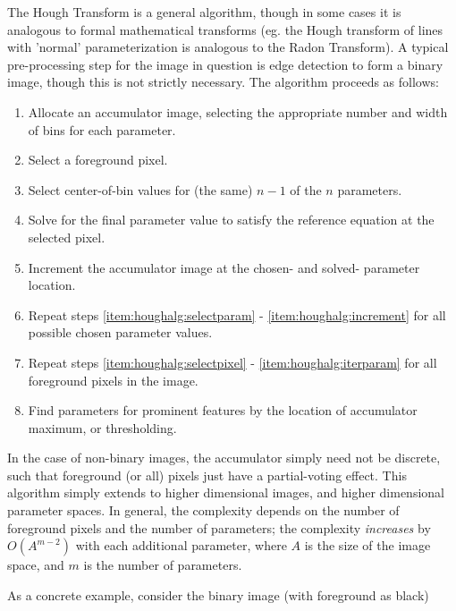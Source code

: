 The Hough Transform is a general algorithm, though in some cases it is analogous to formal mathematical transforms (eg. the Hough transform of lines with 'normal' parameterization is analogous to the Radon Transform). A typical pre-processing step for the image in question is edge detection to form a binary image, though this is not strictly necessary. The algorithm proceeds as follows:
\begin{enumerate}
	\item \label{item:houghalg:allocate} Allocate an accumulator image, selecting the appropriate number and width of bins for each parameter. 
	\item \label{item:houghalg:selectpixel} Select a foreground pixel.
	\item \label{item:houghalg:selectparam} Select center-of-bin values for (the same) $n-1$ of the $n$ parameters.
	\item \label{item:houghalg:solve} Solve for the final parameter value to satisfy the reference equation at the selected pixel.
	\item \label{item:houghalg:increment} Increment the accumulator image at the chosen- and solved- parameter location.
	\item \label{item:houghalg:iterparam} Repeat steps \ref{item:houghalg:selectparam} - \ref{item:houghalg:increment} for all possible chosen parameter values.
	\item \label{item:houghalg:iterpixel} Repeat steps \ref{item:houghalg:selectpixel} - \ref{item:houghalg:iterparam} for all foreground pixels in the image.
	\item \label{item:houghalg:findfeatures} Find parameters for prominent features by the location of accumulator maximum, or thresholding.
\end{enumerate}
In the case of non-binary images, the accumulator simply need not be discrete, such that foreground (or all) pixels just have a partial-voting effect. This algorithm simply extends to higher dimensional images, and higher dimensional parameter spaces. In general, the complexity depends on the number of foreground pixels and the number of parameters; the complexity \textit{increases} by $O(A^{m-2})$ with each additional parameter, where $A$ is the size of the image space, and $m$ is the number of parameters.

As a concrete example, consider the binary image (with foreground as black)
\begin{center}
\end{center}

